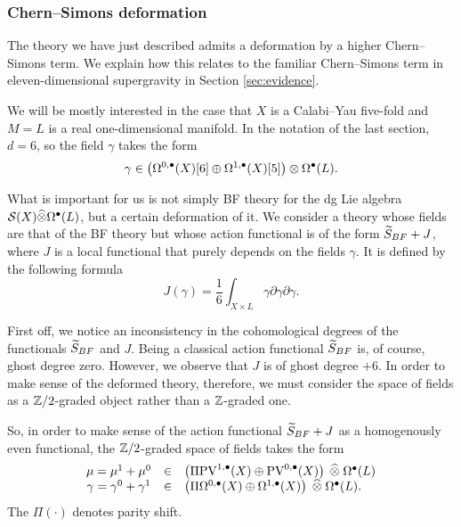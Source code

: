 \documentclass[11pt]{amsart}
\def\pv{{\rm PV}}
\begin{document}
\subsubsection{Chern--Simons deformation}
The theory we have just described admits a deformation by a higher Chern--Simons term.
We explain how this relates to the familiar Chern--Simons term in eleven-dimensional supergravity in Section \ref{sec:evidence}.

We will be mostly interested in the case that $X$ is a Calabi--Yau five-fold and $M=L$ is a real one-dimensional manifold.
In the notation of the last section, $d = 6$, so the field $\gamma$ takes the form
\[
  \gamma \in \left(\Omega^{0,\bu}(X)[6] \oplus \Omega^{1,\bu}(X)[5] \right) \otimes \Omega^\bu(L).
\]

What is important for us is not simply BF theory for the dg Lie algebra $\cS(X) \Hat{\otimes} \Omega^\bu(L)$, but a certain deformation of it.
We consider a theory whose fields are that of the BF theory but whose action functional is of the form $\Tilde{S}_{BF} + J$, where $J$ is a local functional that purely depends on the fields $\gamma$.
It is defined by the following formula
\[
J(\gamma) = \frac16 \int_{X\times L} \gamma \partial \gamma \partial \gamma .
\]

First off, we notice an inconsistency in the cohomological degrees of the functionals $\Tilde{S}_{BF}$ and $J$.
Being a classical action functional $\Tilde{S}_{BF}$ is, of course, ghost degree zero.
However, we observe that $J$ is of ghost degree $+6$.
In order to make sense of the deformed theory, therefore, we must consider the space of fields as a $\ZZ/2$-graded object rather than a $\ZZ$-graded one.

So, in order to make sense of the action functional $\Tilde{S}_{BF} + J$ as a homogenously even functional, the $\ZZ /2$-graded space of fields takes the form
\[
  \begin{array}{ccl}
    \mu = \mu^1+\mu^0 & \in & \left(\Pi \pv^{1,\bu}(X) \oplus \pv^{0,\bu}(X) \right) \; \Hat{\otimes} \; \Omega^{\bu}(L) \\
    \gamma = \gamma^0+ \gamma^1 & \in & \left(\Pi \Omega^{0,\bu}(X) \oplus \Omega^{1,\bu}(X) \right) \; \Hat{\otimes}\; \Omega^{\bu}(L) .
  \end{array}
\]
The $\Pi(\cdot)$ denotes parity shift. 
\end{document}
